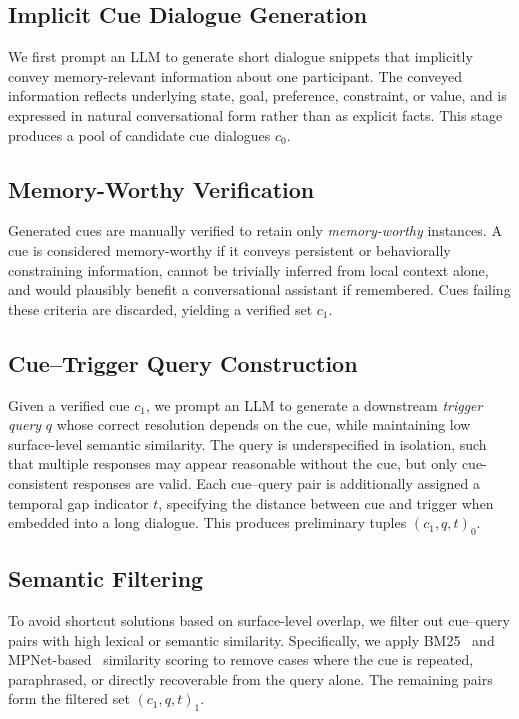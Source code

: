 \documentclass[11pt]{article}
\begin{document}
\subsection{Implicit Cue Dialogue Generation}

We first prompt an LLM to generate short dialogue snippets that
implicitly convey memory-relevant information about one participant.
The conveyed information reflects underlying state, goal, preference,
constraint, or value, and is expressed in natural conversational form
rather than as explicit facts.
This stage produces a pool of candidate cue dialogues $c_0$.

\subsection{Memory-Worthy Verification}

Generated cues are manually verified to retain only
\emph{memory-worthy} instances.
A cue is considered memory-worthy if it conveys persistent or
behaviorally constraining information, cannot be trivially inferred from
local context alone, and would plausibly benefit a conversational
assistant if remembered.
Cues failing these criteria are discarded, yielding a verified set
$c_1$.

\subsection{Cue--Trigger Query Construction}

Given a verified cue $c_1$, we prompt an LLM to generate a downstream
\emph{trigger query} $q$ whose correct resolution depends on the cue,
while maintaining low surface-level semantic similarity.
The query is underspecified in isolation, such that multiple responses
may appear reasonable without the cue, but only cue-consistent responses
are valid.
Each cue--query pair is additionally assigned a temporal gap indicator
$t$, specifying the distance between cue and trigger when embedded into a
long dialogue.
This produces preliminary tuples $(c_1, q, t)_0$.

\subsection{Semantic Filtering}

To avoid shortcut solutions based on surface-level overlap,
we filter out cue–query pairs with high lexical or semantic similarity.
Specifically, we apply BM25~\cite{Amati2009} and MPNet-based~\cite{song2020mpnet} similarity scoring to remove
cases where the cue is repeated, paraphrased, or directly recoverable
from the query alone.
The remaining pairs form the filtered set $(c_1, q, t)_1$.
\end{document}
